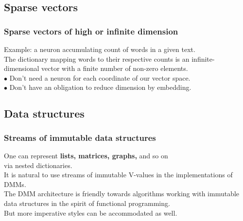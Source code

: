 \documentclass{beamer}
\newcommand{\msmagenta}[1]{{\color{mymagenta} #1}}
\begin{document}
\subsection{Sparse vectors}



\begin{frame}

  \frametitle{\msmagenta{Sparse vectors of high or infinite dimension}}

Example:  a neuron accumulating count of words in a given text.\\[2ex]

The dictionary mapping words to their respective counts is an infinite-dimensional vector
with a finite number of non-zero elements.\\[2ex]

\msmagenta{\Large $\bullet$} Don't need a neuron for each coordinate of our vector space.\\[2ex]

 \msmagenta{\Large $\bullet$} Don't have an obligation to reduce dimension by embedding.

\end{frame}





\subsection{Data structures}





\begin{frame}

  \frametitle{Streams of immutable \msmagenta{data structures}}

One can represent {\bf lists, matrices, graphs,} and so on\\ via nested dictionaries.\\[3ex]


It is natural to use streams of immutable V-values in the implementations of DMMs.\\[3ex]

The DMM architecture is friendly towards algorithms working with immutable data structures in
the spirit of functional programming.\\[3ex]

But more imperative styles can be accommodated as well.

\end{frame}
\end{document}

